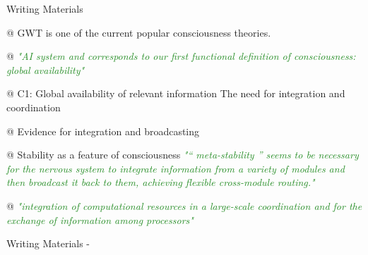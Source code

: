\documentclass[utf8]{article}
\newenvironment{WritingMaterials} %
    	{
            \begin{tcolorbox}[enhanced,
                title=-,
                size=small,
                colbacktitle=Aquamarine,
                drop fuzzy shadow,
                fontupper=\small,
                boxrule=0.4pt,
                colback=Aquamarine!10!white,
                sharp corners]
                Writing Materials
            \end{tcolorbox}
            \begin{easylist}[itemize]
    	}
    	{
            \end{easylist}  
            \begin{tcolorbox}[enhanced,
                halign=flush right,
                halign title=right,
                size=small,
                colbacktitle=Aquamarine,
                drop fuzzy shadow,
                fontupper=\small,
                boxrule=0.4pt,
                colback=Aquamarine,
                colupper=White,
                sharp corners]
                Writing Materials -
            \end{tcolorbox}        
    	}
\newcommand{\rewrite}[1]{\textcolor{ForestGreen}{\textit{"#1"}}\newline}
\begin{document}
			\begin{WritingMaterials}
				@ GWT is one of the current popular consciousness theories.

				@ \rewrite{AI system and corresponds to our first functional definition of consciousness: global availability} \cite{Dehaene2017}

				@ C1: Global availability of relevant information The need for integration and coordination \cite{Dehaene2017}

				@ Evidence for integration and broadcasting

				@ Stability as a feature of consciousness \rewrite{“ meta-stability ” seems to be necessary for the nervous system to integrate information from a variety of modules and then broadcast it back to them, achieving flexible cross-module routing.}

				@ \rewrite{integration of computational resources in a large-scale coordination and for the exchange of information among processors}


\end{WritingMaterials}
\end{document}
